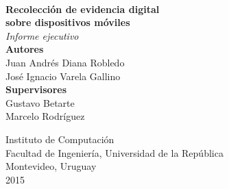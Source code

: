 \begin{center}

\textsc{}\\[3.0cm]

{\huge\textbf{Recolección de evidencia digital}}\\[0.2cm]
{\huge\textbf{sobre dispositivos móviles}}\\[0.3cm]
{\large \textit{Informe ejecutivo}\\[2.0cm]

\textbf{Autores}\\
Juan Andrés Diana Robledo\\
José Ignacio Varela Gallino\\[1.5cm]
\textbf{Supervisores}\\
Gustavo Betarte\\
Marcelo Rodríguez\\[1cm]
}
\vfill

{
\large{Instituto de Computación\\
Facultad de Ingeniería, Universidad de la República\\
Montevideo, Uruguay\\
2015\\}
}
\end{center}

